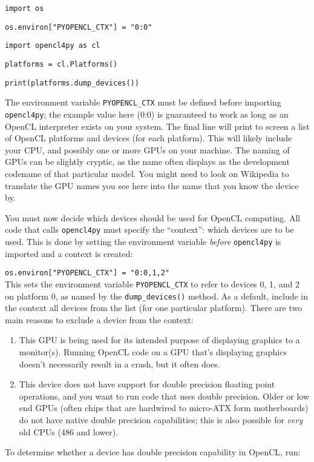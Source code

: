 \documentclass[12pt,pdftex,letterpaper]{article}
\begin{document}
\texttt{import os}

\texttt{os.environ["PYOPENCL\_CTX"] = "0:0"}

\texttt{import opencl4py as cl}

\texttt{platforms = cl.Platforms()}

\texttt{print(platforms.dump\_devices())}

The environment variable \texttt{PYOPENCL\_CTX} must be defined before importing \texttt{opencl4py}; the example value here (0:0) is guaranteed to work as long as an OpenCL interpreter exists on your system.  The final line will print to screen a list of OpenCL platforms and devices (for each platform).  This will likely include your CPU, and possibly one or more GPUs on your machine.  The naming of GPUs can be slightly cryptic, as the name often displays as the development codename of that particular model.  You might need to look on Wikipedia to translate the GPU names you see here into the name that you know the device by.

You must now decide which devices should be used for OpenCL computing.  All code that calls \texttt{opencl4py} must specify the ``context'': which devices are to be used.  This is done by setting the environment variable \textit{before} \texttt{opencl4py} is imported and a context is created:

\texttt{os.environ["PYOPENCL\_CTX"] = "0:0,1,2"}\\
This sets the environment variable \texttt{PYOPENCL\_CTX} to refer to devices 0, 1, and 2 on platform 0, as named by the \texttt{dump\_devices()} method.  As a default, include in the context all devices from the list (for one particular platform).  There are two main reasons to exclude a device from the context:
\begin{enumerate}
\item This GPU is being used for its intended purpose of displaying graphics to a monitor(s).  Running OpenCL code on a GPU that's displaying graphics doesn't necessarily result in a crash, but it often does.

\item This device does not have support for double precision floating point operations, and you want to run code that uses double precision.  Older or low end GPUs (often chips that are hardwired to micro-ATX form motherboards) do not have native double precision capabilities; this is also possible for \textit{very} old CPUs (486 and lower). 
\end{enumerate}
To determine whether a device has double precision capability in OpenCL, run:
\end{document}
